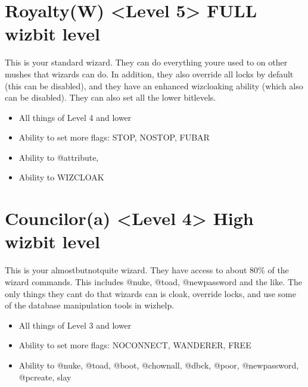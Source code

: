 \documentclass[letterpaper,10pt,english]{sphinxmanual}
\begin{document}
\section{Royalty(W) \textless{}Level 5\textgreater{} \sphinxhyphen{} FULL wizbit level}
\label{\detokenize{bitlevels:royalty-w-level-5-full-wizbit-level}}
\sphinxAtStartPar
This is your standard wizard.  They can do everything you\textquotesingle{}re
used to on other mushes that wizards can do.  In addition, they
also override all locks by default (this can be disabled), and
they have an enhanced wizcloaking ability (which also can be
disabled).  They can also set all the lower bitlevels.
\begin{itemize}
\item {} 
\sphinxAtStartPar
All things of Level 4 and lower

\item {} 
\sphinxAtStartPar
Ability to set more flags: STOP, NOSTOP, FUBAR

\item {} 
\sphinxAtStartPar
Ability to @attribute,

\item {} 
\sphinxAtStartPar
Ability to WIZCLOAK

\end{itemize}


\section{Councilor(a) \textless{}Level 4\textgreater{} \sphinxhyphen{} High wizbit level}
\label{\detokenize{bitlevels:councilor-a-level-4-high-wizbit-level}}
\sphinxAtStartPar
This is your almost\sphinxhyphen{}but\sphinxhyphen{}not\sphinxhyphen{}quite wizard.  They have access to
about 80\% of the wizard commands.  This includes @nuke, @toad,
@newpassword and the like.  The only things they can\textquotesingle{}t do that
wizards can is cloak, override locks, and use some of the
database manipulation tools in wizhelp.
\begin{itemize}
\item {} 
\sphinxAtStartPar
All things of Level 3 and lower

\item {} 
\sphinxAtStartPar
Ability to set more flags: NOCONNECT, WANDERER, FREE

\item {} 
\sphinxAtStartPar
Ability to @nuke, @toad, @boot, @chownall, @dbck, @poor, @newpassword, @pcreate, slay

\end{itemize}
\end{document}

